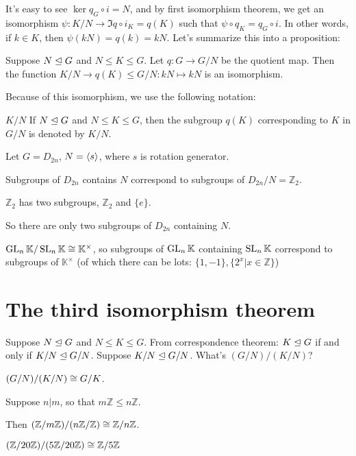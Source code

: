 It's easy to see $\ker q_G\circ i=N$, and by first isomorphism theorem, we get an isomorphism $\psi:K/N\to \Im q\circ i_K=q(K)$ such that $\psi\circ q_K = q_G\circ i$. In other words, if $k\in K$, then $\psi(kN)=q(k)=kN$. Let's summarize this into a proposition:

\begin{prop}
Suppose $N\trianglelefteq G$ and $N\le K\le G$. Let $q:G\to G/N$ be the quotient map. Then the function $K/N\to q(K)\le G/N:kN\mapsto kN$ is an isomorphism.
\end{prop}

Because of this isomorphism, we use the following notation:

\begin{notation}{$K/N$}
If $N\trianglelefteq G$ and $N\le K\le G$, then the subgroup $q(K)$ corresponding to $K$ in $G/N$ is denoted by $K/N$. 
\end{notation}

\begin{ex}[$D_{2n}$]
Let $G=D_{2n}$, $N=\left\langle s \right\rangle$, where $s$ is rotation generator.

Subgroups of $D_{2n}$ contains $N$ correspond to subgroups of $D_{2n}/N=\mathbb{Z}_2$.

$\mathbb{Z}_2$ has two subgroups, $\mathbb{Z}_2$ and $\{e\}$.

So there are only two subgroups of $D_{2n}$ containing $N$.
\end{ex}

\begin{ex}[$\gl_n \mathbb{K}$]
$\operatorname{GL}_n \mathbb{K}/\operatorname{SL}_n \mathbb{K}\cong \mathbb{K}^\times$, so subgroups of $\gl_n \mathbb{K}$ containing $\operatorname{SL}_n \mathbb{K}$ correspond to subgroups of $\mathbb{K}^\times$ (of which there can be lots: $\{1,-1\}, \{2^x| x\in \mathbb{Z}\}$)
\end{ex}


\section{The third isomorphism theorem}
Suppose $N\trianglelefteq G$ and $N\le K\le G$. From correspondence theorem: $K\trianglelefteq G$ if and only if $K/N\trianglelefteq G/N$. Suppose $K/N\trianglelefteq G/N$. What's $(G/N)/(K/N)$?

\begin{thm}
$(G/N)/(K/N)\cong G/K$.
\end{thm}

\begin{ex}
Suppose $n|m$, so that $m\mathbb{Z}\le n \mathbb{Z}$. 

Then $(\mathbb{Z}/m\mathbb{Z})/(n\mathbb{Z}/\mathbb{Z})\cong \mathbb{Z}/n\mathbb{Z}$.

$(\mathbb Z/{20}\mathbb Z)/(5\mathbb{Z}/20 \mathbb{Z})\cong \mathbb{Z}/5 \mathbb{Z}$
\end{ex}

